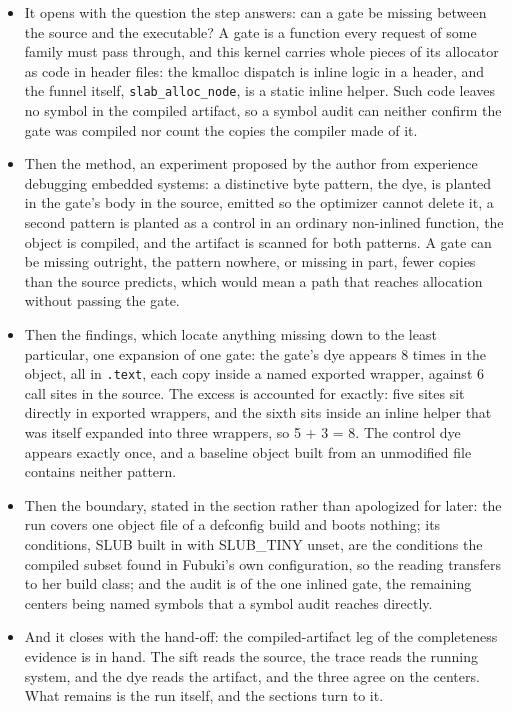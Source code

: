 \documentclass[11pt]{article}
\begin{document}
\begin{itemize}
\item It opens with the question the step answers: can a gate be missing between the source and the executable? A gate is a function every request of some family must pass through, and this kernel carries whole pieces of its allocator as code in header files: the kmalloc dispatch is inline logic in a header, and the funnel itself, \texttt{slab\_alloc\_node}, is a static inline helper. Such code leaves no symbol in the compiled artifact, so a symbol audit can neither confirm the gate was compiled nor count the copies the compiler made of it.
\item Then the method, an experiment proposed by the author from experience debugging embedded systems: a distinctive byte pattern, the dye, is planted in the gate's body in the source, emitted so the optimizer cannot delete it, a second pattern is planted as a control in an ordinary non-inlined function, the object is compiled, and the artifact is scanned for both patterns. A gate can be missing outright, the pattern nowhere, or missing in part, fewer copies than the source predicts, which would mean a path that reaches allocation without passing the gate.
\item Then the findings, which locate anything missing down to the least particular, one expansion of one gate: the gate's dye appears 8 times in the object, all in \texttt{.text}, each copy inside a named exported wrapper, against 6 call sites in the source. The excess is accounted for exactly: five sites sit directly in exported wrappers, and the sixth sits inside an inline helper that was itself expanded into three wrappers, so 5 + 3 = 8. The control dye appears exactly once, and a baseline object built from an unmodified file contains neither pattern.
\item Then the boundary, stated in the section rather than apologized for later: the run covers one object file of a defconfig build and boots nothing; its conditions, SLUB built in with SLUB\_TINY unset, are the conditions the compiled subset found in Fubuki's own configuration, so the reading transfers to her build class; and the audit is of the one inlined gate, the remaining centers being named symbols that a symbol audit reaches directly.
\item And it closes with the hand-off: the compiled-artifact leg of the completeness evidence is in hand. The sift reads the source, the trace reads the running system, and the dye reads the artifact, and the three agree on the centers. What remains is the run itself, and the sections turn to it.
\end{itemize}
\end{document}
